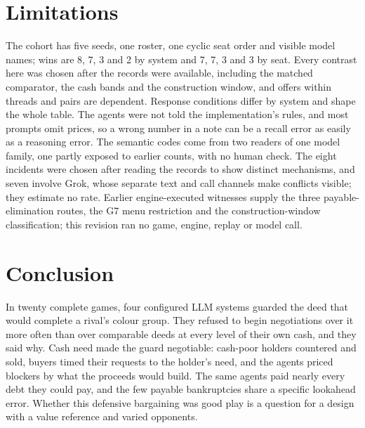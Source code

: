 \documentclass[11pt,letterpaper]{article}
\begin{document}
\section{Limitations}
\label{sec:limits}

The cohort has five seeds, one roster, one cyclic seat order and visible model names; wins are 8, 7, 3 and 2 by system and 7, 7, 3 and 3 by seat. Every contrast here was chosen after the records were available, including the matched comparator, the cash bands and the construction window, and offers within threads and pairs are dependent. Response conditions differ by system and shape the whole table. The agents were not told the implementation's rules, and most prompts omit prices, so a wrong number in a note can be a recall error as easily as a reasoning error. The semantic codes come from two readers of one model family, one partly exposed to earlier counts, with no human check. The eight incidents were chosen after reading the records to show distinct mechanisms, and seven involve Grok, whose separate text and call channels make conflicts visible; they estimate no rate. Earlier engine-executed witnesses supply the three payable-elimination routes, the G7 menu restriction and the construction-window classification; this revision ran no game, engine, replay or model call.

\section{Conclusion}

In twenty complete games, four configured LLM systems guarded the deed that would complete a rival's colour group. They refused to begin negotiations over it more often than over comparable deeds at every level of their own cash, and they said why. Cash need made the guard negotiable: cash-poor holders countered and sold, buyers timed their requests to the holder's need, and the agents priced blockers by what the proceeds would build. The same agents paid nearly every debt they could pay, and the few payable bankruptcies share a specific lookahead error. Whether this defensive bargaining was good play is a question for a design with a value reference and varied opponents.
\end{document}
